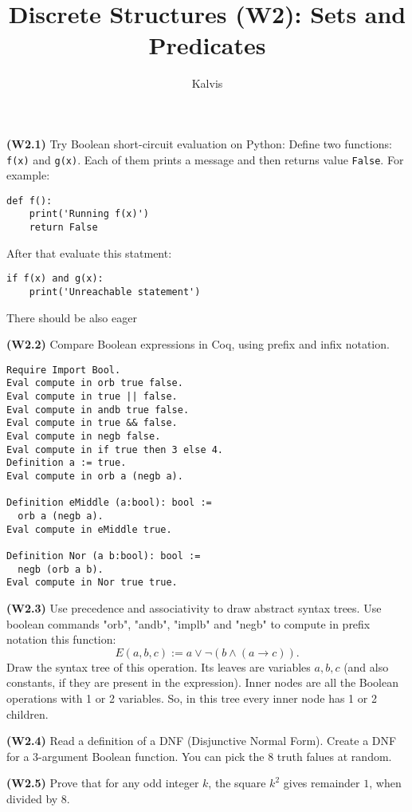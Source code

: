 \documentclass[jou]{apa6}
\title{Discrete Structures (W2): Sets and Predicates}
\author{Kalvis}
\affiliation{RBS}
\begin{document}
\maketitle


{\bf (W2.1)} Try Boolean short-circuit evaluation on Python: 
Define two functions: {\tt f(x)} and {\tt g(x)}. Each of them 
prints a message and then returns value {\tt False}. For example:
\begin{verbatim}
def f():
    print('Running f(x)')
	return False
\end{verbatim}
After that evaluate this statment:
\begin{verbatim}
if f(x) and g(x):
    print('Unreachable statement')
\end{verbatim}
There should be also eager 

%

{\bf (W2.2)} Compare Boolean expressions in Coq, using prefix and infix notation.
\begin{verbatim}
Require Import Bool.
Eval compute in orb true false.
Eval compute in true || false.
Eval compute in andb true false.
Eval compute in true && false.
Eval compute in negb false.
Eval compute in if true then 3 else 4.
Definition a := true.
Eval compute in orb a (negb a).

Definition eMiddle (a:bool): bool :=
  orb a (negb a).
Eval compute in eMiddle true.

Definition Nor (a b:bool): bool :=
  negb (orb a b).
Eval compute in Nor true true.  
\end{verbatim}


{\bf (W2.3)} Use precedence and associativity to draw abstract syntax trees.
Use boolean commands "orb", "andb", "implb" and "negb" to 
compute in prefix notation this function: 
$$E(a,b,c) := a \vee \neg(b \wedge (a \rightarrow c)).$$
Draw the syntax tree of this operation. Its leaves
are variables $a,b,c$ (and also constants, if they are present in the expression). 
Inner nodes are all the Boolean operations with 1 or 2 variables. 
So, in this tree every inner node has 1 or 2 children. 

{\bf (W2.4)} Read a definition of a DNF (Disjunctive Normal Form). 
Create a DNF for a 3-argument Boolean function. 
You can pick the $8$ truth falues at random.

{\bf (W2.5)} 
Prove that for any odd integer $k$, the square $k^2$ 
gives remainder $1$, when divided by $8$.
\end{document}

